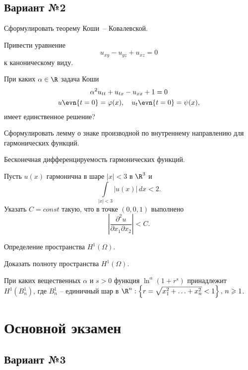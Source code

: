 \documentclass{article}
\begin{document}
\subsection{Вариант №2}

\begin{nums}{-2}
\item \begin{nums}{-2}
\item Сформулировать теорему Коши~-- Ковалевской.
\item Привести уравнение
$$
u_{xy} - u_{yz} + u_{xz} = 0
$$
к каноническому виду.
\item При каких $\alpha \in \R $ задача Коши
\begin{gather*}
\alpha^2u_{tt} + u_{tx} - u_{xx} + 1 = 0\\
u\evn{t = 0} = \varphi(x), \quad u_t\evn{t = 0} = \psi(x),
\end{gather*}
имеет единственное решение?
\end{nums}
\item \begin{nums}{-2}
\item Сформулировать лемму о знаке производной по внутреннему
направлению для гармонических функций.
\item Бесконечная дифференцируемость гармонических функций.
\item Пусть $u(x)$ гармонична в шаре $|x| < 3$ в $\R ^3$ и
$$
\int\limits_{|x| < 3}|u(x)|\,dx < 2.
$$
Указать $C = const$ такую, что в точке $(0, 0, 1)$ выполнено
$$
\left|\frac{\partial^2 u}{\partial x_1 \partial x_2}\right| < C.
$$
\end{nums}
\item \begin{nums}{-2}
\item Определение пространства $H^1(\Omega)$.
\item Доказать полноту пространства $H^1(\Omega)$.
\item При каких вещественных $\alpha$ и $s > 0$ функция $\ln^\alpha(1 + r^s)$ принадлежит $H^1(B^1_n)$, где $B^1_n$ --
единичный шар в $\R ^n: \left\{r = \sqrt{x_1^2 + \ldots +
x_n^2} < 1\right\}, \, n \geqslant 1$.
\end{nums}
\end{nums}

\section{Основной экзамен}

\subsection{Вариант №3}
\end{document}
